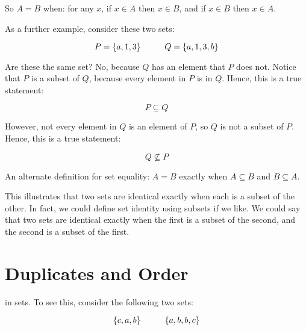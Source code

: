 \documentclass[../../../main.tex]{subfiles}
\begin{document}
\begin{aside}
  \begin{remark}
    So $A = B$ when: for any $x$, if $x \in A$ then $x \in B$, and if $x \in B$ then $x \in A$.
  \end{remark}
\end{aside}

As a further example, consider these two sets:

\begin{equation*}
  P = \{ a, 1, 3 \} \hskip 1cm Q = \{ a, 1, 3, b \}
\end{equation*}

Are these the same set? No, because $Q$ has an element that $P$ does not. Notice that $P$ is a subset of $Q$, because every element in $P$ is in $Q$. Hence, this is a true statement:

\begin{equation*}
  P \subseteq Q
\end{equation*}

However, not every element in $Q$ is an element of $P$, so $Q$ is not a subset of $P$. Hence, this is a true statement:

\begin{equation*}
  Q \not \subseteq P
\end{equation*}

\begin{aside}
  \begin{remark}
    An alternate definition for set equality: $A = B$ exactly when $A \subseteq B$ and $B \subseteq A$.
  \end{remark}
\end{aside}

This illustrates that two sets are identical exactly when each is a subset of the other. In fact, we could define set identity using subsets if we like. We could say that two sets are identical exactly when the first is a subset of the second, and the second is a subset of the first. 


\section{Duplicates and Order}

 in sets. To see this, consider the following two sets:

\begin{equation*}
  \{ c, a, b \} \hskip 1cm \{ a, b, b, c \}
\end{equation*}
\end{document}
